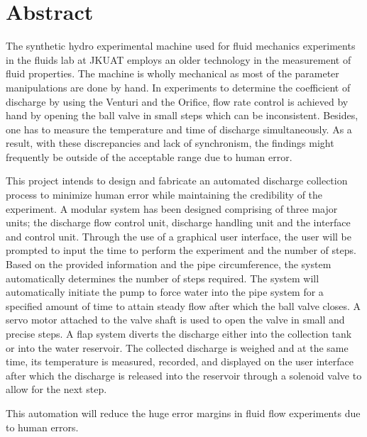\section*{Abstract}
\label{sec:}
\par
The synthetic hydro experimental machine used for fluid mechanics experiments in the fluids lab at JKUAT employs an older technology in the measurement of fluid properties. The machine is wholly mechanical as most of the parameter manipulations are done by hand. In experiments to determine the coefficient of discharge by using the Venturi and the Orifice, flow rate control is achieved by hand by opening the ball valve in small steps which can be inconsistent. Besides, one has to measure the temperature and time of discharge simultaneously. As a result, with these discrepancies and lack of synchronism, the findings might frequently be outside of the acceptable range due to human error.
\par
This project intends to design and fabricate an automated discharge collection process to minimize human error while maintaining the credibility of the experiment. A  modular system has been designed comprising of three major units; the discharge flow control unit, discharge handling unit and the interface and control unit. Through the use of a graphical user interface, the user will be prompted to input the time to perform the experiment and the number of steps. Based on the provided information and the pipe circumference, the system automatically determines the number of steps required. The system will automatically initiate the pump to force water into the pipe system for a specified amount of time to attain steady flow after which the ball valve closes. A servo motor attached to the valve shaft is used to open the valve in small and precise steps. A flap system diverts the discharge either into the collection tank or into the water reservoir. The collected discharge is weighed and at the same time, its temperature is measured, recorded, and displayed on the user interface after which the discharge is released into the reservoir through a solenoid valve to allow for the next step.
\par
This automation will reduce the huge error margins in fluid flow experiments due to human errors.